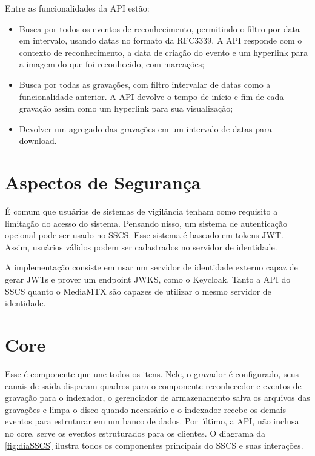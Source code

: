 \documentclass[12pt, %
openright, 
oneside, %
a4paper,    %
brazil]{facom-ufu-abntex2}
\begin{document}
Entre as funcionalidades da API estão:
\begin{itemize}
	\item Busca por todos os eventos de reconhecimento, permitindo o filtro
	      por data em intervalo, usando datas no formato da RFC3339. A API responde com o
	      contexto de reconhecimento, a data de criação do evento e um hyperlink para a
	      imagem do que foi reconhecido, com marcações;
	\item Busca por todas as gravações, com filtro intervalar de datas como
	      a funcionalidade anterior. A API devolve o tempo de início e fim de cada
	      gravação assim como um hyperlink para sua visualização;
	\item Devolver um agregado das gravações em um intervalo de datas para
	      download.
\end{itemize}

\section{Aspectos de Segurança}

É comum que usuários de sistemas de vigilância tenham como requisito a
limitação do acesso do sistema. Pensando nisso, um sistema de autenticação
opcional pode ser usado no SSCS. Esse sistema é baseado em tokens JWT. Assim,
usuários válidos podem ser cadastrados no servidor de identidade.

A implementação consiste em usar um servidor de identidade externo capaz de
gerar JWTs e prover um endpoint JWKS, como o Keycloak. Tanto a API do SSCS
quanto o MediaMTX são capazes de utilizar o mesmo servidor de identidade.

\section{Core}

Esse é componente que une todos os itens. Nele, o gravador é configurado, seus
canais de saída disparam quadros para o componente reconhecedor e eventos de
gravação para o indexador, o gerenciador de armazenamento salva os arquivos das
gravações e limpa o disco quando necessário e o indexador recebe os demais
eventos para estruturar em um banco de dados. Por último, a API, não inclusa no
core, serve os eventos estruturados para os clientes. O diagrama da
\autoref{fig:diaSSCS} ilustra todos os componentes principais do SSCS e suas
interações.
\end{document}
